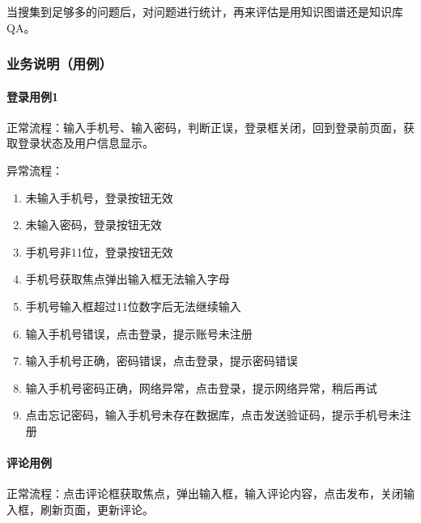 \documentclass[letterpaper,10pt,english]{sphinxmanual}
\begin{document}
当搜集到足够多的问题后，对问题进行统计，再来评估是用知识图谱还是知识库QA。


\subsubsection{业务说明（用例）}
\label{\detokenize{chapter_knowledge/service_analysis:id1}}\label{\detokenize{chapter_knowledge/service_analysis::doc}}

\paragraph{登录用例1\sphinxfootnotemark[642]}
\label{\detokenize{chapter_knowledge/service_analysis:id2}}%
\begin{footnotetext}[642]\sphinxAtStartFootnote
{}
%
\end{footnotetext}\ignorespaces 
正常流程：输入手机号、输入密码，判断正误，登录框关闭，回到登录前页面，获取登录状态及用户信息显示。

异常流程：
\begin{enumerate}
%
\item {} 
未输入手机号，登录按钮无效

\item {} 
未输入密码，登录按钮无效

\item {} 
手机号非11位，登录按钮无效

\item {} 
手机号获取焦点弹出输入框无法输入字母

\item {} 
手机号输入框超过11位数字后无法继续输入

\item {} 
输入手机号错误，点击登录，提示账号未注册

\item {} 
输入手机号正确，密码错误，点击登录，提示密码错误

\item {} 
输入手机号密码正确，网络异常，点击登录，提示网络异常，稍后再试

\item {} 
点击忘记密码，输入手机号未存在数据库，点击发送验证码，提示手机号未注册

\end{enumerate}


\paragraph{评论用例}
\label{\detokenize{chapter_knowledge/service_analysis:id3}}
正常流程：点击评论框获取焦点，弹出输入框，输入评论内容，点击发布，关闭输入框，刷新页面，更新评论。
\end{document}
